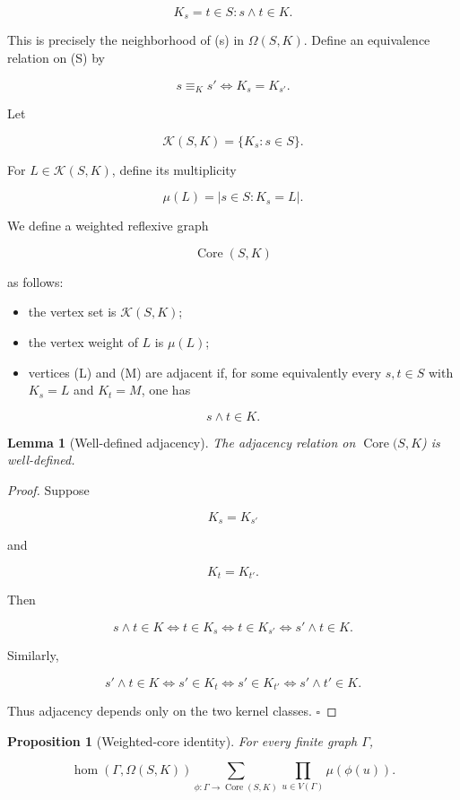\documentclass[11pt]{article}
\newtheorem{proposition}[theorem]{Proposition}
\newtheorem{lemma}[theorem]{Lemma}
\begin{document}
\[
K_s={t\in S:s\wedge t\in K}.
\]

This is precisely the neighborhood of (s) in $\Omega(S,K)$. Define an equivalence relation on (S) by

\[
s\equiv_K s'
\iff
K_s=K_{s'}.
\]

Let

\[
\mathcal K(S,K)=\{K_s:s\in S\}.
\]

For $L\in\mathcal K(S,K)$, define its multiplicity

\[
\mu(L)=|{s\in S:K_s=L}|.
\]

We define a weighted reflexive graph

\[
\operatorname{Core}(S,K)
\]

as follows:

\begin{itemize}
\item the vertex set is $\mathcal K(S,K)$;
\item the vertex weight of $L$ is $\mu(L)$;
\item vertices (L) and (M) are adjacent if, for some equivalently every $s,t\in S$ with $K_s=L$ and $K_t=M$, one has
\end{itemize}

\[
s\wedge t\in K.
\]

\begin{lemma}[Well-defined adjacency]
The adjacency relation on $\operatorname{Core}(S,K$) is well-defined.

\end{lemma}

\begin{proof}
Suppose

\[
K_s=K_{s'}
\]

and

\[
K_t=K_{t'}.
\]

Then

\[
s\wedge t\in K
\iff
t\in K_s
\iff
t\in K_{s'}
\iff
s'\wedge t\in K.
\]

Similarly,

\[
s'\wedge t\in K
\iff
s'\in K_t
\iff
s'\in K_{t'}
\iff
s'\wedge t'\in K.
\]

Thus adjacency depends only on the two kernel classes. $\square$

\end{proof}

\begin{proposition}[Weighted-core identity]
For every finite graph $\Gamma$,

\[
\operatorname{hom}(\Gamma,\Omega(S,K))
\sum_{\phi:\Gamma\to\operatorname{Core}(S,K)}
\prod_{u\in V(\Gamma)}\mu(\phi(u)).
\]

\end{proposition}
\end{document}
